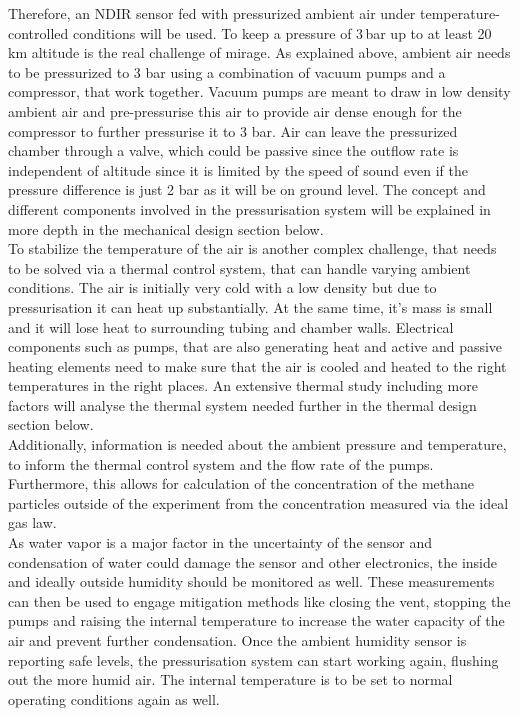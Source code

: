 Therefore, an NDIR sensor fed with pressurized ambient air under temperature-controlled conditions will be used. To keep a pressure of 3\,bar up to at least 20\,km altitude is the real challenge of \gls{mirage}. As explained above, ambient air needs to be pressurized to 3 bar using a combination of vacuum pumps and a compressor, that work together. Vacuum pumps are meant to draw in low density ambient air and pre-pressurise this air to provide air dense enough for the compressor to further pressurise it to 3 bar. Air can leave the pressurized chamber through a valve, which could be passive since the outflow rate is independent of altitude since it is limited by the speed of sound even if the pressure difference is just 2 bar as it will be on ground level. The concept and different components involved in the pressurisation system will be explained in more depth in the mechanical design section below. \\
To stabilize the temperature of the air is another complex challenge, that needs to be solved via a thermal control system, that can handle varying ambient conditions. The air is initially very cold with a low density but due to pressurisation it can heat up substantially. At the same time, it's mass is small and it will lose heat to surrounding tubing and chamber walls. Electrical components such as pumps, that are also generating heat and active and passive heating elements need to make sure that the air is cooled and heated to the right temperatures in the right places. An extensive thermal study including more factors will analyse the thermal system needed further in the thermal design section below.\\
Additionally, information is needed about the ambient pressure and temperature, to inform the thermal control system and the flow rate of the pumps. Furthermore, this allows for calculation of the concentration of the methane particles outside of the experiment from the concentration measured via the ideal gas law.\\
As water vapor is a major factor in the uncertainty of the sensor and condensation of water could damage the sensor and other electronics, the inside and ideally outside humidity should be monitored as well.
These measurements can then be used to engage mitigation methods like closing the vent, stopping the pumps and raising the internal temperature to increase the water capacity of the air and prevent further condensation. Once the ambient humidity sensor is reporting safe levels, the pressurisation system can start working again, flushing out the more humid air. The internal temperature is to be set to normal operating conditions again as well. \\
